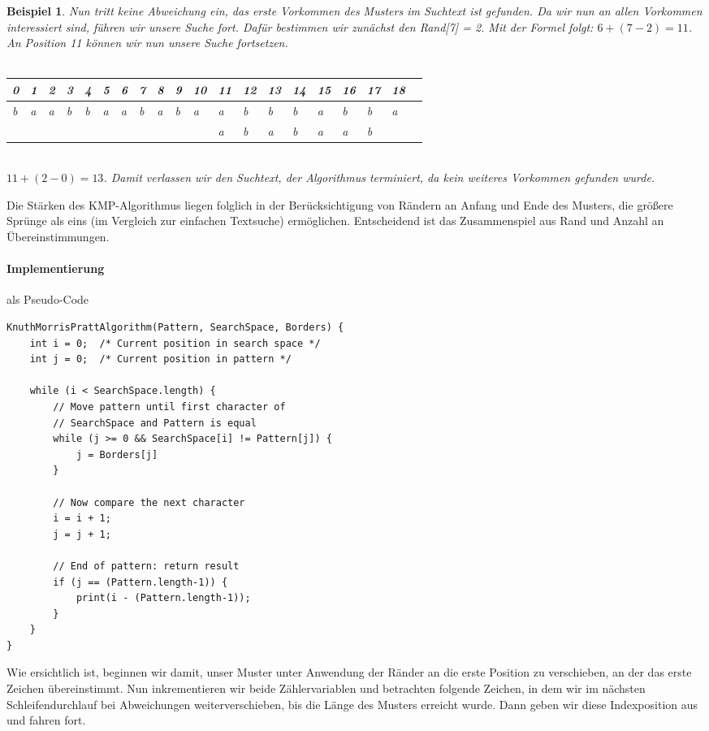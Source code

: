 \documentclass[11pt,a4paper]{scrartcl}
\newtheorem{example}{Beispiel}
\begin{document}
\begin{example}
Nun tritt keine Abweichung ein, das erste Vorkommen des Musters im Suchtext ist gefunden. Da wir nun an allen Vorkommen interessiert sind, führen wir unsere Suche fort. Dafür bestimmen wir zunächst den Rand[7] = 2. Mit der Formel folgt: $6+(7-2) = 11$. An Position 11 können wir nun unsere Suche fortsetzen.\\\\
\begin{tabular}{|l|l|l|l|l|l|l|l|l|l|l|l|l|l|l|l|l|l|l|l|}
\hline
0&1&2&3&4&5&6&7&8&9&10&11&12&13&14&15&16&17&18 \\
\hline
b&a&a&b&b&a&a&b&a&b&a&\cellcolor{green}a&\cellcolor{green}b&\cellcolor{red}b&b&a&b&b&a \\
\hline
 & & & & & & & & & & &\cellcolor{green}a&\cellcolor{green}b&\cellcolor{red}a&b&a&a&b&    \\
\hline
\end{tabular}\\
$11+(2-0) = 13$. Damit verlassen wir den Suchtext, der Algorithmus terminiert, da kein weiteres Vorkommen gefunden wurde.
\end{example}
Die Stärken des KMP-Algorithmus liegen folglich in der Berücksichtigung von Rändern an Anfang und Ende des Musters, die größere Sprünge als eins (im Vergleich zur einfachen Textsuche) ermöglichen. Entscheidend ist das Zusammenspiel aus Rand und Anzahl an Übereinstimmungen.
\paragraph{Implementierung}
als Pseudo-Code
\begin{lstlisting}
KnuthMorrisPrattAlgorithm(Pattern, SearchSpace, Borders) {
	int i = 0;	/* Current position in search space */
	int j = 0;	/* Current position in pattern */

	while (i < SearchSpace.length) {
		// Move pattern until first character of 
		// SearchSpace and Pattern is equal
		while (j >= 0 && SearchSpace[i] != Pattern[j]) {
			j = Borders[j]		
		} 
		
		// Now compare the next character
		i = i + 1;
		j = j + 1;

		// End of pattern: return result		
		if (j == (Pattern.length-1)) {
			print(i - (Pattern.length-1));		
		}
	}
}
\end{lstlisting}
Wie ersichtlich ist, beginnen wir damit, unser Muster unter Anwendung der Ränder an die erste Position zu verschieben, an der das erste Zeichen übereinstimmt. Nun inkrementieren wir beide Zählervariablen und betrachten folgende Zeichen, in dem wir im nächsten Schleifendurchlauf bei Abweichungen weiterverschieben, bis die Länge des Musters erreicht wurde. Dann geben wir diese Indexposition aus und fahren fort. 
\end{document}
